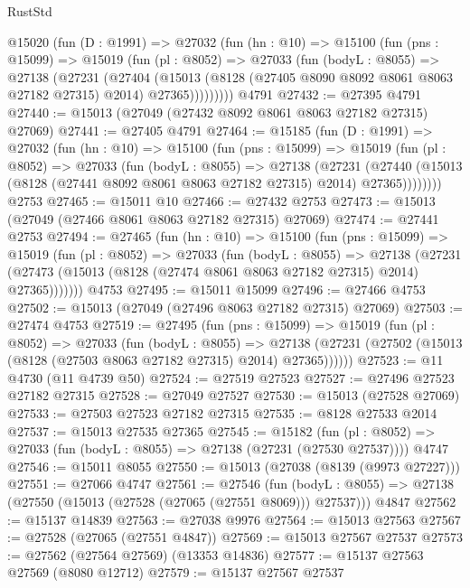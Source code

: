 \begin{lexlean}{RustStd}
\begin{coremodule}
    @15020
      (fun (D : @1991) =>
      @27032
        (fun (hn : @10) =>
        @15100
          (fun (pns : @15099) =>
          @15019
            (fun (pl : @8052) =>
            @27033
              (fun (bodyL : @8055) =>
              @27138
                (@27231
                  (@27404
                    (@15013
                      (@8128 (@27405 @8090 @8092 @8061 @8063 @27182 @27315) @2014)
                      @27365)))))))))
    @4791
@27432 := @27395 @4791
@27440 := @15013 (@27049 (@27432 @8092 @8061 @8063 @27182 @27315) @27069)
@27441 := @27405 @4791
@27464 := @15185
    (fun (D : @1991) =>
    @27032
      (fun (hn : @10) =>
      @15100
        (fun (pns : @15099) =>
        @15019
          (fun (pl : @8052) =>
          @27033
            (fun (bodyL : @8055) =>
            @27138
              (@27231
                (@27440
                  (@15013 (@8128 (@27441 @8092 @8061 @8063 @27182 @27315) @2014) @27365))))))))
    @2753
@27465 := @15011 @10
@27466 := @27432 @2753
@27473 := @15013 (@27049 (@27466 @8061 @8063 @27182 @27315) @27069)
@27474 := @27441 @2753
@27494 := @27465
    (fun (hn : @10) =>
    @15100
      (fun (pns : @15099) =>
      @15019
        (fun (pl : @8052) =>
        @27033
          (fun (bodyL : @8055) =>
          @27138
            (@27231 (@27473 (@15013 (@8128 (@27474 @8061 @8063 @27182 @27315) @2014) @27365)))))))
    @4753
@27495 := @15011 @15099
@27496 := @27466 @4753
@27502 := @15013 (@27049 (@27496 @8063 @27182 @27315) @27069)
@27503 := @27474 @4753
@27519 := @27495
    (fun (pns : @15099) =>
    @15019
      (fun (pl : @8052) =>
      @27033
        (fun (bodyL : @8055) =>
        @27138 (@27231 (@27502 (@15013 (@8128 (@27503 @8063 @27182 @27315) @2014) @27365))))))
@27523 := @11 @4730 (@11 @4739 @50)
@27524 := @27519 @27523
@27527 := @27496 @27523 @27182 @27315
@27528 := @27049 @27527
@27530 := @15013 (@27528 @27069)
@27533 := @27503 @27523 @27182 @27315
@27535 := @8128 @27533 @2014
@27537 := @15013 @27535 @27365
@27545 := @15182
    (fun (pl : @8052) => @27033 (fun (bodyL : @8055) => @27138 (@27231 (@27530 @27537))))
    @4747
@27546 := @15011 @8055
@27550 := @15013 (@27038 (@8139 (@9973 @27227)))
@27551 := @27066 @4747
@27561 := @27546
    (fun (bodyL : @8055) => @27138 (@27550 (@15013 (@27528 (@27065 (@27551 @8069))) @27537)))
    @4847
@27562 := @15137 @14839
@27563 := @27038 @9976
@27564 := @15013 @27563
@27567 := @27528 (@27065 (@27551 @4847))
@27569 := @15013 @27567 @27537
@27573 := @27562 (@27564 @27569) (@13353 @14836)
@27577 := @15137 @27563 @27569 (@8080 @12712)
@27579 := @15137 @27567 @27537

\end{coremodule}
\end{lexlean}
